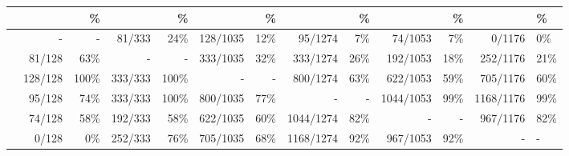 \begin{tabular}{lrrrrrrrrrrr}
\toprule
{} &    &  \% &    &  \% &     &  \% &      &  \% &      &  \% &      &  \% \\
\midrule
{} &        - &        - &   81/333 &      24\% &  128/1035 &      12\% &    95/1274 &       7\% &    74/1053 &       7\% &     0/1176 &       0\% \\
 &   81/128 &      63\% &        - &        - &  333/1035 &      32\% &   333/1274 &      26\% &   192/1053 &      18\% &   252/1176 &      21\% \\
 &  128/128 &     100\% &  333/333 &     100\% &         - &        - &   800/1274 &      63\% &   622/1053 &      59\% &   705/1176 &      60\% \\
 &   95/128 &      74\% &  333/333 &     100\% &  800/1035 &      77\% &          - &        - &  1044/1053 &      99\% &  1168/1176 &      99\% \\
 &   74/128 &      58\% &  192/333 &      58\% &  622/1035 &      60\% &  1044/1274 &      82\% &          - &        - &   967/1176 &      82\% \\
 &    0/128 &       0\% &  252/333 &      76\% &  705/1035 &      68\% &  1168/1274 &      92\% &   967/1053 &      92\% &          - &        - \\
\bottomrule
\end{tabular}
